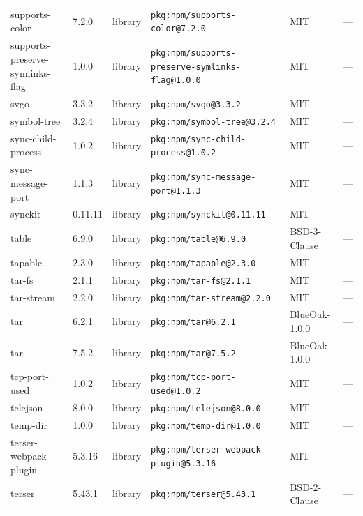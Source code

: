 \documentclass[11pt,a4paper]{article}
\begin{document}
\begin{longtable}{|p{4cm}|p{2cm}|p{1.6cm}|p{5cm}|p{1.5cm}|p{3.5cm}|}
\raggedright supports-color & 7.2.0 & library & \small\texttt{pkg:npm/supports-color@7.2.0} & MIT & \small — \\
\raggedright supports-preserve-symlinks-flag & 1.0.0 & library & \small\texttt{pkg:npm/supports-preserve-symlinks-flag@1.0.0} & MIT & \small — \\
\raggedright svgo & 3.3.2 & library & \small\texttt{pkg:npm/svgo@3.3.2} & MIT & \small — \\
\raggedright symbol-tree & 3.2.4 & library & \small\texttt{pkg:npm/symbol-tree@3.2.4} & MIT & \small — \\
\raggedright sync-child-process & 1.0.2 & library & \small\texttt{pkg:npm/sync-child-process@1.0.2} & MIT & \small — \\
\raggedright sync-message-port & 1.1.3 & library & \small\texttt{pkg:npm/sync-message-port@1.1.3} & MIT & \small — \\
\raggedright synckit & 0.11.11 & library & \small\texttt{pkg:npm/synckit@0.11.11} & MIT & \small — \\
\raggedright table & 6.9.0 & library & \small\texttt{pkg:npm/table@6.9.0} & BSD-3-Clause & \small — \\
\raggedright tapable & 2.3.0 & library & \small\texttt{pkg:npm/tapable@2.3.0} & MIT & \small — \\
\raggedright tar-fs & 2.1.1 & library & \small\texttt{pkg:npm/tar-fs@2.1.1} & MIT & \small — \\
\raggedright tar-stream & 2.2.0 & library & \small\texttt{pkg:npm/tar-stream@2.2.0} & MIT & \small — \\
\raggedright tar & 6.2.1 & library & \small\texttt{pkg:npm/tar@6.2.1} & BlueOak-1.0.0 & \small — \\
\raggedright tar & 7.5.2 & library & \small\texttt{pkg:npm/tar@7.5.2} & BlueOak-1.0.0 & \small — \\
\raggedright tcp-port-used & 1.0.2 & library & \small\texttt{pkg:npm/tcp-port-used@1.0.2} & MIT & \small — \\
\raggedright telejson & 8.0.0 & library & \small\texttt{pkg:npm/telejson@8.0.0} & MIT & \small — \\
\raggedright temp-dir & 1.0.0 & library & \small\texttt{pkg:npm/temp-dir@1.0.0} & MIT & \small — \\
\raggedright terser-webpack-plugin & 5.3.16 & library & \small\texttt{pkg:npm/terser-webpack-plugin@5.3.16} & MIT & \small — \\
\raggedright terser & 5.43.1 & library & \small\texttt{pkg:npm/terser@5.43.1} & BSD-2-Clause & \small — \\

\end{longtable}
\end{document}
